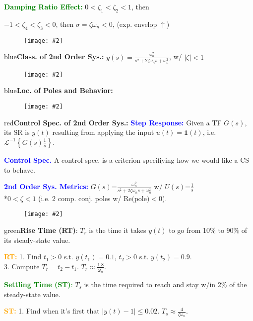 \documentclass[5pt]{extarticle} %
\newcommand{\customFigure}[3][]{%
    \vspace{-1.5em}
    \begin{figure}[H]
        \centering
        \texttt{[image: \#2]}
    \end{figure}
    \vspace{-1.5em}
}
\begin{document}
\begin{paracol}{3}
{    \textcolor{green}{\textbf{Damping Ratio Effect:}} $0 < \zeta_1 < \zeta_2 < 1$, then \\

    $-1 < \zeta_4 < \zeta_3 < 0$, then $\sigma = \zeta \omega_n <0$, (exp. envelop $\uparrow$) \\
    \customFigure[0.2]{../Images/L10_4.png}

    \textcolor{blue}{\textbf{Class. of 2nd Order Sys.:}} $y(s) = \frac{\omega_n^2}{s^2 + 2\zeta\omega_n s + \omega_n^2}$, w/ $|\zeta| < 1$ \\
    \customFigure[0.2]{../Images/L10_1.png}

    \textcolor{blue}{\textbf{Loc. of Poles and Behavior:}} 
    \customFigure[0.2]{../Images/L10_2.png}

    \textcolor{red}{\textbf{Control Spec. of 2nd Order Sys.:}} \textcolor{blue}{\textbf{Step Response:}} Given a TF $G(s)$, its SR is $y(t)$ resulting from applying the input $u(t) = \mathbf{1}(t)$, i.e. $\mathcal{L}^{-1} \left\{G(s) \frac{1}{s} \right\}$.

    \textcolor{blue}{\textbf{Control Spec.}} A control spec. is a criterion specifiying how we would like a CS to behave. 


    \textcolor{blue}{\textbf{2nd Order Sys. Metrics:}} $G(s) \text{=} \frac{\omega_n^2}{s^2 + 2\zeta\omega_n s + \omega_n^2}$ w/ $U(s) \text{=} \frac{1}{s}$ \\
    *$0 < \zeta < 1$ (i.e. 2 comp. conj. poles w/ $\text{Re(pole)}<0$). 
    \customFigure[0.2]{../Images/L10_6.png}

    \textcolor{green}{\textbf{Rise Time (RT)}:} $T_r$ is the time it takes $y(t)$ to go from 10\% to 90\% of its steady-state value.

    \textcolor{orange}{\textbf{RT:}} 1. Find $t_1 > 0$ s.t. $y(t_1) = 0.1$, $t_2 > 0$ s.t. $y(t_2) = 0.9$. \\
    3. Compute $T_r = t_2 - t_1$. $\boxed{T_r \approx \frac{1.8}{\omega_n}}$. 

    \textcolor{green}{\textbf{Settling Time (ST)}:} $T_s$ is the time required to reach and stay w/in 2\% of the steady-state value.

    \textcolor{orange}{\textbf{ST:}} 1. Find when it's first that $|y(t) - 1| \leq 0.02$. $\boxed{T_s \approx \frac{4}{\zeta \omega_n}}$.

}
\end{paracol}
\end{document}
